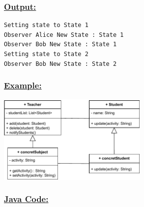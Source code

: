 

\vspace{0.25cm}


\vspace{0.25cm}

\newpage


\vspace{0.5cm}

\newpage

\subsubsection*{\underline{Output:}}
\begin{lstlisting}[style=cmd]
Setting state to State 1
Observer Alice New State : State 1
Observer Bob New State : State 1
Setting state to State 2
Observer Bob New State : State 2
\end{lstlisting}
\vspace{0.5cm}

\vspace{0.25cm}
\subsubsection*{\underline{Example:}}

\vspace{0.25cm}
\begin{center}
\includegraphics[width=0.55\textwidth,height=0.4\textheight]{Chapters/DesignPattern/Observer/obs2.drawio.pdf}
\end{center}

\newpage
\subsubsection*{\underline{Java Code:}}


